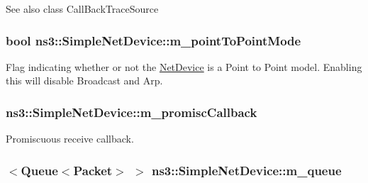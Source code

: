\begin{DoxySeeAlso}{See also}
class Call\+Back\+Trace\+Source 
\end{DoxySeeAlso}
\subsubsection[{\texorpdfstring{m\+\_\+point\+To\+Point\+Mode}{m_pointToPointMode}}]{\setlength{\rightskip}{0pt plus 5cm}bool ns3\+::\+Simple\+Net\+Device\+::m\+\_\+point\+To\+Point\+Mode\hspace{0.3cm}{\ttfamily [private]}}\hypertarget{classns3_1_1SimpleNetDevice_a9e0e98464addc8f65a1e95a405b7119c}{}\label{classns3_1_1SimpleNetDevice_a9e0e98464addc8f65a1e95a405b7119c}
Flag indicating whether or not the \hyperlink{classns3_1_1NetDevice}{Net\+Device} is a Point to Point model. Enabling this will disable Broadcast and Arp. 
\subsubsection[{\texorpdfstring{m\+\_\+promisc\+Callback}{m_promiscCallback}}]{ ns3\+::\+Simple\+Net\+Device\+::m\+\_\+promisc\+Callback\hspace{0.3cm}{\ttfamily [private]}}\hypertarget{classns3_1_1SimpleNetDevice_ad791745401d21961805c25572ccd7458}{}\label{classns3_1_1SimpleNetDevice_ad791745401d21961805c25572ccd7458}


Promiscuous receive callback. 

\subsubsection[{\texorpdfstring{m\+\_\+queue}{m_queue}}]{$<${\bf Queue}$<${\bf Packet}$>$ $>$ ns3\+::\+Simple\+Net\+Device\+::m\+\_\+queue\hspace{0.3cm}{\ttfamily [private]}}\hypertarget{classns3_1_1SimpleNetDevice_a72e1e606223c7e4683f64259d14ef065}{}\label{classns3_1_1SimpleNetDevice_a72e1e606223c7e4683f64259d14ef065}


